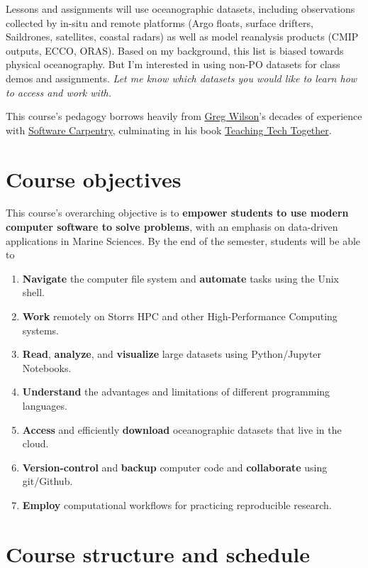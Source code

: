 \documentclass[11pt]{article}
\begin{document}
Lessons and assignments will use oceanographic datasets, including observations
collected by in-situ and remote platforms (Argo floats, surface drifters,
Saildrones, satellites, coastal radars) as well as model reanalysis products
(CMIP outputs, ECCO, ORAS). Based on my background, this list is
biased towards physical oceanography. But I’m interested in using non-PO
datasets for class demos and assignments. \emph{Let me know which datasets you would like to learn how to access and work with.}

This course's pedagogy borrows heavily from \href{https://third-bit.com}{Greg Wilson}'s decades of experience with \href{https://software-carpentry.org}{Software Carpentry}, culminating in his book \href{https://teachtogether.tech/en/index.html}{Teaching Tech Together}.


\section*{Course objectives}
This course's overarching objective is to  \textbf{empower students to use modern computer software to solve problems}, with an emphasis on data-driven applications in Marine Sciences. By the end of the semester, students will be able to 

\begin{enumerate}
	\item \textbf{Navigate} the computer file system and \textbf{automate} tasks using the Unix shell.
	\item \textbf{Work} remotely on Storrs HPC and other High-Performance Computing systems.
	\item \textbf{Read}, \textbf{analyze}, and \textbf{visualize} large datasets using Python/Jupyter Notebooks.
	\item \textbf{Understand} the advantages and limitations of different programming languages.
	\item \textbf{Access} and efficiently \textbf{download}  oceanographic datasets that live in the cloud. 
	\item \textbf{Version-control} and \textbf{backup} computer code and \textbf{collaborate} using git/Github.
	\item \textbf{Employ} computational workflows for practicing reproducible research.
\end{enumerate}

\section*{Course structure and schedule}
\end{document}
